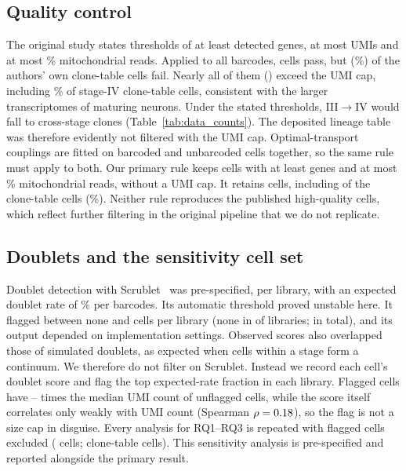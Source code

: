 \subsection{Quality control}
The original study states thresholds of at least \minGenes{} detected genes, at most
\umiCap{} UMIs and at most \maxMt\% mitochondrial reads. Applied to all barcodes,
\nPaperQCPass{} cells pass, but \nCloneTableFailPaperQC{} (\pctCloneTableFailPaperQC\%)
of the authors' own clone-table cells fail. Nearly all of them (\nCloneTableOverUMICap)
exceed the UMI cap, including \pctStageIVOverUMICap\% of stage-IV clone-table cells,
consistent with the larger transcriptomes of maturing neurons. Under the stated
thresholds, III$\to$IV would fall to \nExpThreeClonesPaperQC{} cross-stage clones
(Table~\ref{tab:data_counts}). The deposited lineage table was therefore evidently not
filtered with the UMI cap. Optimal-transport couplings are fitted on barcoded and
unbarcoded cells together, so the same rule must apply to both. Our primary rule keeps
cells with at least \minGenes{} genes and at most \maxMt\% mitochondrial reads, without
a UMI cap. It retains \nPrimaryCells{} cells, including \nCloneTablePrimary{} of the
\nCloneTableCells{} clone-table cells (\pctCloneTableKept\%). Neither rule reproduces
the published \nPublishedCells{} high-quality cells, which reflect further filtering in
the original pipeline that we do not replicate.

\subsection{Doublets and the sensitivity cell set}
Doublet detection with Scrublet~\cite{Wolock_2019} was pre-specified, per library, with
an expected doublet rate of \dblRatePct\% per \dblRatePer{} barcodes. Its automatic
threshold proved unstable here. It flagged between none and \nScrubletAutoMax{} cells per
library (none in \nLibsScrubletZero{} of \nLibraries{} libraries; \nScrubletAutoTotal{}
in total), and its output depended on implementation settings. Observed scores also
overlapped those of simulated doublets, as expected when cells within a stage form a
continuum. We therefore do not filter on Scrublet. Instead we record each cell's doublet
score and flag the top expected-rate fraction in each library. Flagged cells have
\umiRatioFlagMin--\umiRatioFlagMax{} times the median UMI count of unflagged cells,
while the score itself correlates only weakly with UMI count (Spearman
$\rho=0.18$), so the flag is not a size cap in disguise. Every analysis for
RQ1--RQ3 is repeated with flagged cells excluded (\nSensitivityCells{} cells;
\nCloneTableSensitivity{} clone-table cells). This sensitivity analysis is
pre-specified and reported alongside the primary result.

